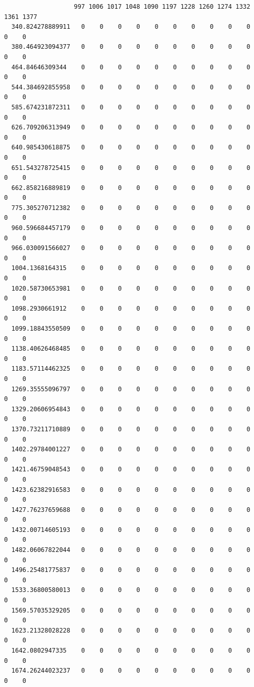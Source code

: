 \documentclass[
  letterpaper,
  DIV=11,
  numbers=noendperiod]{scrartcl}
\begin{document}
\begin{verbatim}
                   997 1006 1017 1048 1090 1197 1228 1260 1274 1332 1361 1377
  340.824278889911   0    0    0    0    0    0    0    0    0    0    0    0
  380.464923094377   0    0    0    0    0    0    0    0    0    0    0    0
  464.84646309344    0    0    0    0    0    0    0    0    0    0    0    0
  544.384692855958   0    0    0    0    0    0    0    0    0    0    0    0
  585.674231872311   0    0    0    0    0    0    0    0    0    0    0    0
  626.709206313949   0    0    0    0    0    0    0    0    0    0    0    0
  640.985430618875   0    0    0    0    0    0    0    0    0    0    0    0
  651.543278725415   0    0    0    0    0    0    0    0    0    0    0    0
  662.858216889819   0    0    0    0    0    0    0    0    0    0    0    0
  775.305270712382   0    0    0    0    0    0    0    0    0    0    0    0
  960.596684457179   0    0    0    0    0    0    0    0    0    0    0    0
  966.030091566027   0    0    0    0    0    0    0    0    0    0    0    0
  1004.1368164315    0    0    0    0    0    0    0    0    0    0    0    0
  1020.58730653981   0    0    0    0    0    0    0    0    0    0    0    0
  1098.2930661912    0    0    0    0    0    0    0    0    0    0    0    0
  1099.18843550509   0    0    0    0    0    0    0    0    0    0    0    0
  1138.40626468485   0    0    0    0    0    0    0    0    0    0    0    0
  1183.57114462325   0    0    0    0    0    0    0    0    0    0    0    0
  1269.35555096797   0    0    0    0    0    0    0    0    0    0    0    0
  1329.20606954843   0    0    0    0    0    0    0    0    0    0    0    0
  1370.73211710889   0    0    0    0    0    0    0    0    0    0    0    0
  1402.29784001227   0    0    0    0    0    0    0    0    0    0    0    0
  1421.46759048543   0    0    0    0    0    0    0    0    0    0    0    0
  1423.62382916583   0    0    0    0    0    0    0    0    0    0    0    0
  1427.76237659688   0    0    0    0    0    0    0    0    0    0    0    0
  1432.00714605193   0    0    0    0    0    0    0    0    0    0    0    0
  1482.06067822044   0    0    0    0    0    0    0    0    0    0    0    0
  1496.25481775837   0    0    0    0    0    0    0    0    0    0    0    0
  1533.36800580013   0    0    0    0    0    0    0    0    0    0    0    0
  1569.57035329205   0    0    0    0    0    0    0    0    0    0    0    0
  1623.21328028228   0    0    0    0    0    0    0    0    0    0    0    0
  1642.0802947335    0    0    0    0    0    0    0    0    0    0    0    0
  1674.26244023237   0    0    0    0    0    0    0    0    0    0    0    0

\end{verbatim}
\end{document}
